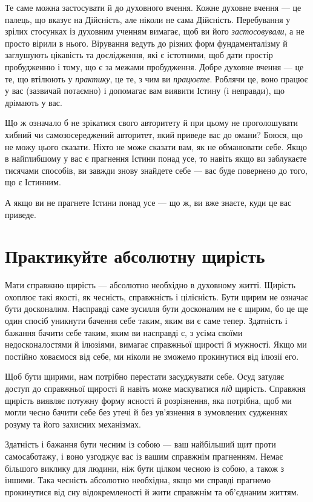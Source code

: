 Те саме можна застосувати й до духовного вчення. Кожне духовне вчення — це палець, що вказує на Дійсність, але ніколи не сама Дійсність. Перебування у зрілих стосунках із духовним ученням вимагає, щоб ви його \emph{застосовували}, а не просто вірили в нього. Вірування ведуть до різних форм фундаменталізму й заглушують цікавість та дослідження, які є істотними, щоб дати простір пробудженню і тому, що є за межами пробудження. Добре духовне вчення — це те, що втілюють у \emph{практику}, це те, з чим ви \emph{працюєте}. Роблячи це, воно працює у вас (зазвичай потаємно) і допомагає вам виявити Істину (і неправди), що дрімають у вас.

Що ж означало б не зрікатися свого авторитету й при цьому не проголошувати хибний чи самозосереджений авторитет, який приведе вас до омани? Боюся, що не можу цього сказати. Ніхто не може сказати вам, як не обманювати себе. Якщо в найглибшому у вас є прагнення Істини понад усе, то навіть якщо ви заблукаєте тисячами способів, ви завжди знову знайдете себе — вас буде повернено до того, що є Істинним.

А якщо ви не прагнете Істини понад усе — що ж, ви вже знаєте, куди це вас приведе.

\section*{Практикуйте абсолютну щирість}

Мати справжню щирість — абсолютно необхідно в духовному житті. Щирість охоплює такі якості, як чесність, справжність і цілісність. Бути щирим не означає бути досконалим. Насправді саме зусилля бути досконалим не є щирим, бо це ще один спосіб уникнути бачення себе таким, яким ви є саме тепер. Здатність і бажання бачити себе таким, яким ви насправді є, з усіма своїми недосконалостями й ілюзіями, вимагає справжньої щирості й мужності. Якщо ми постійно ховаємося від себе, ми ніколи не зможемо прокинутися від ілюзії его.

Щоб бути щирими, нам потрібно перестати засуджувати себе. Осуд затуляє доступ до справжньої щирості й навіть може маскуватися \emph{під} щирість. Справжня щирість виявляє потужну форму ясності й розрізнення, яка потрібна, щоб ми могли чесно бачити себе без утечі й без ув'язнення в зумовлених судженнях розуму та його захисних механізмах.

Здатність і бажання бути чесним із собою — ваш найбільший щит проти самосаботажу, і воно узгоджує вас із вашим справжнім прагненням. Немає більшого виклику для людини, ніж бути цілком чесною із собою, а також з іншими. Така чесність абсолютно необхідна, якщо ми справді прагнемо прокинутися від сну відокремленості й жити справжнім та об'єднаним життям.


